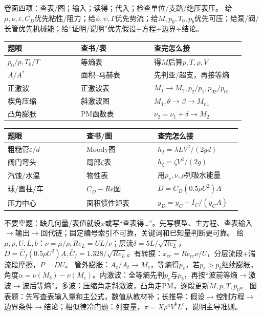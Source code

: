 卷面四项：查\underline{\hspace{0.35cm}}表/图；输入\underline{\hspace{0.45cm}}；读得\underline{\hspace{0.45cm}}；代入\underline{\hspace{0.5cm}}；检查单位/支路/绝压表压。
给$\mu,\nu,\varepsilon,C_D$优先粘性/阻力；给$\phi,\psi,\Gamma$优先势流；给$M,p_0,T_0,p_b$优先可压；给泵/阀/长管优先机械能；给“证明/说明”优先假设+方程+边界+结论。
\begin{tabular}{|p{0.29\linewidth}|p{0.29\linewidth}|p{0.34\linewidth}|}\hline
题眼 & 查书/表 & 查完怎么接\\\hline
$p_0/p,T_0/T$ & 等熵表 & 得$M$后算$p,T,\rho,V$\\\hline
$A/A^*$ & 面积--马赫表 & 先判亚/超支，再接等熵\\\hline
正激波 & 正激波表 & $M_1\to M_2,p_2/p_1,p_{02}/p_{01}$\\\hline
楔角压缩 & 斜激波图 & $M_1,\theta\to\beta\to M_{n1}$\\\hline
凸角膨胀 & PM函数表 & $\nu_2=\nu_1+\delta\to M_2$\\\hline
\end{tabular}
\begin{tabular}{|p{0.31\linewidth}|p{0.28\linewidth}|p{0.33\linewidth}|}\hline
题眼 & 查书/图 & 查完怎么接\\\hline
粗糙管$\varepsilon/d$ & Moody图 & $h_f=\lambda L V^2/(2gd)$\\\hline
阀门弯头 & 局部$\zeta$表 & $h_\zeta=\zeta V^2/(2g)$\\\hline
汽蚀/水温 & 物性表 & 用$p_v,\nu,\rho$列吸水能量\\\hline
球/圆柱/车 & $C_D-Re$图 & $D=C_D(0.5\rho U^2)A$\\\hline
压力中心 & 面积惯性矩表 & $y_D=y_C+I_C/(y_CA)$\\\hline
\end{tabular}
不要空题：缺几何量/表值就设$x$或写“查表得…”。先写模型、主方程、查表输入$\to$输出$\to$回代链；固定编号索引不可靠，关键词和已知量判断更可靠。
给$\mu,\rho,U,L,b$：$\nu=\mu/\rho,Re_L=UL/\nu$；层流$\delta=5L/\sqrt{Re_L}$，$D=\bar C_f(0.5\rho U^2)A,\bar C_f=1.328/\sqrt{Re_L}$。有转捩：$x_{cr}=Re_{cr}\nu/U$，分层流段+湍流段摩擦，$P=DU$。
管外膨胀：$A_e/A_t\to M_e$，等熵得$p_e$，若$p_e>p_b$继续膨胀，角度$\alpha=\nu(M_b)-\nu(M_e)$。内激波：全等熵先判$p_e$与$p_b$，再按“波前等熵$\to$激波$\to$波后等熵”。多波：压缩角走斜激波，凸角走PM，逐段更新$M,p,T,p_0$。
图表题：先写查表输入量和主公式，数值从教材补；长推导：假设$\to$控制方程$\to$边界条件$\to$结论；相似律冷门题：列变量，$\pi=X\rho^aV^bL^c$，说明主导准则。

